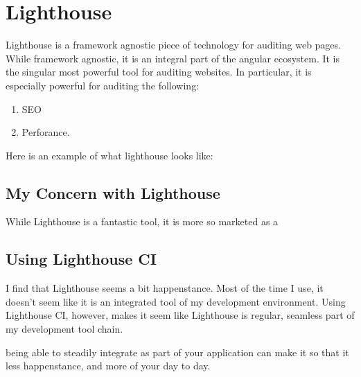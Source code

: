 \chapter{ Lighthouse }    

Lighthouse is a framework agnostic piece of technology for auditing web pages. While framework agnostic, it is an integral part of the angular ecosystem. It is the singular most powerful tool for auditing websites. In particular, it is especially powerful for auditing the following:
\begin{enumerate}
  \item SEO 
  \item Perforance.
\end{enumerate}

Here is an example of what lighthouse looks like: 

\section{My Concern with Lighthouse}
While Lighthouse is a fantastic tool, it is more so marketed as a 

\section{Using Lighthouse CI}

I find that Lighthouse seems a bit happenstance. Most of the time I use, it doesn't seem like it is an integrated tool of my development environment. Using 
Lighthouse CI, however, makes it seem like Lighthouse is regular, seamless part of my development tool chain. 

being able to steadily integrate as part of your application can make it so that it less happenstance, and more of your day to day. 